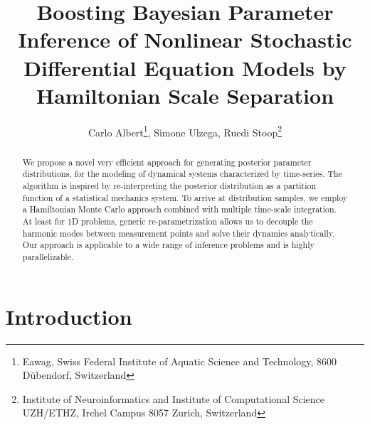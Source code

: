 \documentclass[11pt]{article}
\theoremstyle{definition}
\begin{document}
\title{Boosting Bayesian Parameter Inference of Nonlinear Stochastic Differential Equation Models by Hamiltonian Scale Separation}

\author{Carlo Albert\footnote{Eawag, Swiss Federal Institute of Aquatic Science and Technology, 8600 D\"ubendorf, Switzerland}, Simone Ulzega\footnotemark[1], Ruedi Stoop\footnote{Institute of Neuroinformatics and Institute of Computational Science UZH/ETHZ, Irchel Campus 8057 Zurich, Switzerland}}

\maketitle

\begin{abstract}
We propose a novel very efficient approach for generating posterior parameter distributions, for the modeling of dynamical systems characterized by time-series. The algorithm is inspired by re-interpreting the posterior distribution as a partition function of a
statistical mechanics system. To arrive at distribution samples, we employ a Hamiltonian Monte Carlo approach combined with multiple time-scale integration.
At least for 1D problems, generic re-parametrization allows us to decouple the harmonic modes between measurement points and solve their dynamics analytically.
Our approach is applicable to a wide range of inference problems and is highly parallelizable.


\end{abstract}


\section{Introduction}
\end{document}
